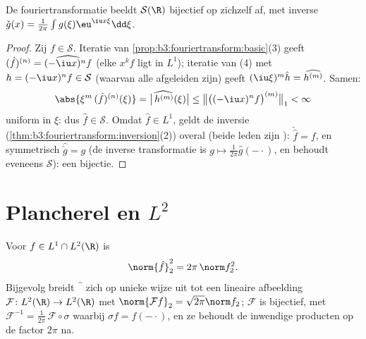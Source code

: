 \begin{theorem}\label{thm:b3:fouriertransform:schwartz}
De fouriertransformatie beeldt $\mathcal S(\R)$ bijectief op
zichzelf af, met inverse $\check g(x) = \frac1{2\pi}\int
g(\xi)\eu^{\iu x\xi}\dd\xi$.
\end{theorem}

\begin{proof}
Zij $f \in \mathcal S$. Iteratie van
\cref{prop:b3:fouriertransform:basic}(3) geeft $(\hat f)^{(n)} =
\widehat{(-\iu x)^nf}$ (elke $x^kf$ ligt in $L^1$); iteratie van
(4) met $h = (-\iu x)^nf \in \mathcal S$ (waarvan alle afgeleiden
 zijn) geeft $(\iu\xi)^m\hat h =
\widehat{h^{(m)}}$. Samen:
\[
\abs{\xi^m\,(\hat f)^{(n)}(\xi)}
= \bigl|\widehat{\,h^{(m)}}(\xi)\bigr|
\leq \bigl\|\bigl((-\iu x)^nf\bigr)^{(m)}\bigr\|_1 < \infty
\]
uniform in $\xi$: dus $\hat f \in \mathcal S$. Omdat $\hat f \in
L^1$, geldt de inversie
(\cref{thm:b3:fouriertransform:inversion}(2)) overal (beide leden
zijn ): $\check{\hat f} = f$, en symmetrisch
$\widehat{\check g} = g$ (de inverse transformatie is $g \mapsto
\frac1{2\pi}\hat g(-\cdot)$, en behoudt eveneens $\mathcal S$):
een bijectie.
\end{proof}

\section{Plancherel en \texorpdfstring{$L^2$}{L2}}

\begin{theorem}[Plancherel]\label{thm:b3:fouriertransform:plancherel}
Voor $f \in L^1 \cap L^2(\R)$ is
\[
\norm{\hat f}_2^2 = 2\pi\,\norm f_2^2 .
\]
Bijgevolg breidt $\widehat{\phantom f}$ zich op unieke wijze uit
tot een  lineaire afbeelding $\mathcal F \colon L^2(\R)
\to L^2(\R)$ met $\norm{\mathcal Ff}_2 = \sqrt{2\pi}\norm f_2$;
$\mathcal F$ is bijectief, met $\mathcal F^{-1} =
\frac1{2\pi}\,\mathcal F\circ\sigma$ waarbij $\sigma f =
f(-\cdot)$, en ze behoudt de inwendige producten op de factor
$2\pi$ na.
\end{theorem}

